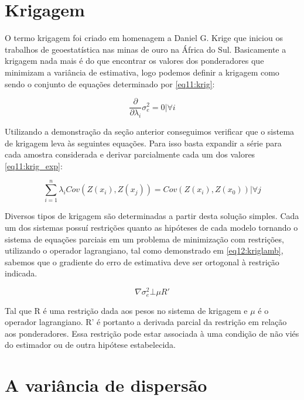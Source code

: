\section{Krigagem}

O termo krigagem foi criado em homenagem a Daniel G. Krige que iniciou os trabalhos de geoestatística nas minas de ouro na África do Sul. Basicamente a krigagem nada mais é do que encontrar os valores dos ponderadores que minimizam a variância de estimativa, logo podemos definir a krigagem como sendo o conjunto de equações determinado por \eqref{eq11:krig}:

\begin{equation}\label{eq11:krig}
\frac{\partial }{\partial \lambda _{i}} \sigma ^{2}_{e}=0|\forall i  
\end{equation}

Utilizando a demonstração da seção anterior conseguimos verificar que o sistema de krigagem leva às seguintes equações. Para isso basta expandir a série para cada amostra considerada e derivar parcialmente cada um dos valores \eqref{eq11:krig_exp}: 

\begin{equation}\label{eq11:krig_exp}
\sum_{i=1}^{n}\lambda _{i}Cov(Z(x_{i}),Z(x_{j}))= Cov(Z(x_{i}),Z(x_{0}))|\forall j
\end{equation}

Diversos tipos de krigagem são determinadas a partir desta solução simples. Cada um dos sistemas possuí restrições quanto as hipóteses de cada modelo tornando o sistema de equações parciais em um problema de minimização com restrições, utilizando o operador lagrangiano, tal como demonstrado em \eqref{eq12:kriglamb}, sabemos que o gradiente do erro de estimativa deve ser ortogonal à restrição indicada. 

\begin{equation}\label{eq12:kriglamb}
\nabla \sigma ^{2}_{e}\bot \mu R' 
\end{equation}

Tal que R é uma restrição dada aos pesos no sistema de krigagem e $\mu$ é o operador lagrangiano. R' é portanto a derivada parcial da restrição em relação aos ponderadores. Essa restrição pode estar associada à uma condição de não viés do estimador ou de outra hipótese estabelecida.  


\section{A variância de dispersão}

